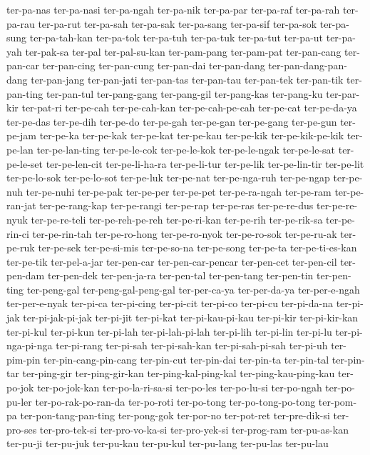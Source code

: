{ter-pa-nas ter-pa-nasi ter-pa-ngah ter-pa-nik ter-pa-par ter-pa-raf
ter-pa-rah ter-pa-rau ter-pa-rut ter-pa-sah ter-pa-sak ter-pa-sang
ter-pa-sif ter-pa-sok ter-pa-sung ter-pa-tah-kan ter-pa-tok ter-pa-tuh
ter-pa-tuk ter-pa-tut ter-pa-ut ter-pa-yah ter-pak-sa ter-pal
ter-pal-su-kan ter-pam-pang ter-pam-pat ter-pan-cang ter-pan-car
ter-pan-cing ter-pan-cung ter-pan-dai ter-pan-dang ter-pan-dang-pan-dang
ter-pan-jang ter-pan-jati ter-pan-tas ter-pan-tau ter-pan-tek ter-pan-tik
ter-pan-ting ter-pan-tul ter-pang-gang ter-pang-gil ter-pang-kas
ter-pang-ku ter-par-kir ter-pat-ri ter-pe-cah ter-pe-cah-kan
ter-pe-cah-pe-cah ter-pe-cat ter-pe-da-ya ter-pe-das ter-pe-dih ter-pe-do
ter-pe-gah ter-pe-gan ter-pe-gang ter-pe-gun ter-pe-jam ter-pe-ka
ter-pe-kak ter-pe-kat ter-pe-kau ter-pe-kik ter-pe-kik-pe-kik ter-pe-lan
ter-pe-lan-ting ter-pe-le-cok ter-pe-le-kok ter-pe-le-ngak ter-pe-le-sat
ter-pe-le-set ter-pe-len-cit ter-pe-li-ha-ra ter-pe-li-tur ter-pe-lik
ter-pe-lin-tir ter-pe-lit ter-pe-lo-sok ter-pe-lo-sot ter-pe-luk
ter-pe-nat ter-pe-nga-ruh ter-pe-ngap ter-pe-nuh ter-pe-nuhi ter-pe-pak
ter-pe-per ter-pe-pet ter-pe-ra-ngah ter-pe-ram ter-pe-ran-jat
ter-pe-rang-kap ter-pe-rangi ter-pe-rap ter-pe-ras ter-pe-re-dus
ter-pe-re-nyuk ter-pe-re-teli ter-pe-reh-pe-reh ter-pe-ri-kan ter-pe-rih
ter-pe-rik-sa ter-pe-rin-ci ter-pe-rin-tah ter-pe-ro-hong ter-pe-ro-nyok
ter-pe-ro-sok ter-pe-ru-ak ter-pe-ruk ter-pe-sek ter-pe-si-mis
ter-pe-so-na ter-pe-song ter-pe-ta ter-pe-ti-es-kan ter-pe-tik
ter-pel-a-jar ter-pen-car ter-pen-car-pencar ter-pen-cet ter-pen-cil
ter-pen-dam ter-pen-dek ter-pen-ja-ra ter-pen-tal ter-pen-tang ter-pen-tin
ter-pen-ting ter-peng-gal ter-peng-gal-peng-gal ter-per-ca-ya
ter-per-da-ya ter-per-e-ngah ter-per-e-nyak ter-pi-ca ter-pi-cing
ter-pi-cit ter-pi-co ter-pi-cu ter-pi-da-na ter-pi-jak ter-pi-jak-pi-jak
ter-pi-jit ter-pi-kat ter-pi-kau-pi-kau ter-pi-kir ter-pi-kir-kan
ter-pi-kul ter-pi-kun ter-pi-lah ter-pi-lah-pi-lah ter-pi-lih ter-pi-lin
ter-pi-lu ter-pi-nga-pi-nga ter-pi-rang ter-pi-sah ter-pi-sah-kan
ter-pi-sah-pi-sah ter-pi-uh ter-pim-pin ter-pin-cang-pin-cang ter-pin-cut
ter-pin-dai ter-pin-ta ter-pin-tal ter-pin-tar ter-ping-gir
ter-ping-gir-kan ter-ping-kal-ping-kal ter-ping-kau-ping-kau ter-po-jok
ter-po-jok-kan ter-po-la-ri-sa-si ter-po-les ter-po-lu-si ter-po-ngah
ter-po-pu-ler ter-po-rak-po-ran-da ter-po-roti ter-po-tong
ter-po-tong-po-tong ter-pom-pa ter-pon-tang-pan-ting ter-pong-gok
ter-por-no ter-pot-ret ter-pre-dik-si ter-pro-ses ter-pro-tek-si
ter-pro-vo-ka-si ter-pro-yek-si ter-prog-ram ter-pu-as-kan ter-pu-ji
ter-pu-juk ter-pu-kau ter-pu-kul ter-pu-lang ter-pu-las ter-pu-lau
}
